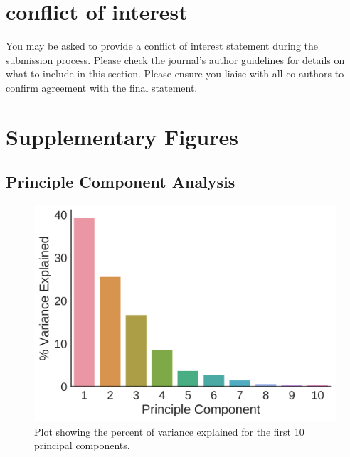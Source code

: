 \documentclass[alpha-refs]{wiley-article}
\begin{document}
\section*{conflict of interest}
You may be asked to provide a conflict of interest statement during the submission process. Please check the journal's author guidelines for details on what to include in this section. Please ensure you liaise with all co-authors to confirm agreement with the final statement.

\printendnotes



\section{Supplementary Figures}
\subsection{Principle Component Analysis}

\begin{figure}
	\centering
	\includegraphics[height=0.45\textheight]{img/qc/pca_scree}
	\caption{Plot showing the percent of variance explained for the first 10 principal components.}
	\label{fig:qc:scree}
\end{figure}
\end{document}
